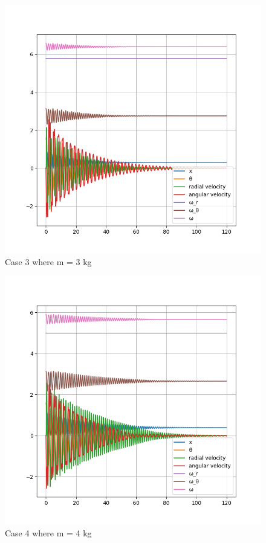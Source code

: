\begin{figure}[H]
    \centering
    \includegraphics[width=15cm]{SimPictures/m3.png}
    \caption{{Case 3 where m = 3 kg}}
    \label{}
\end{figure}
        
\begin{figure}[H]
    \centering
    \includegraphics[width=15cm]{SimPictures/m4.png}
    \caption{{Case 4 where m = 4 kg}}
    \label{}
\end{figure}
        
